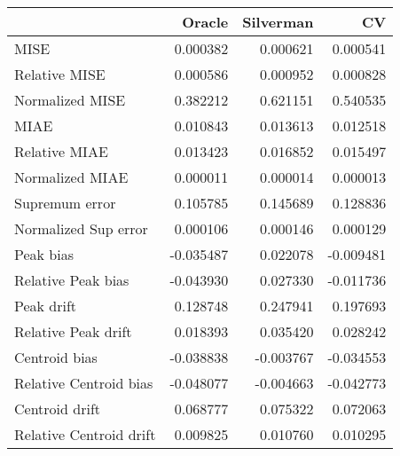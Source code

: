 \begin{tabular}{lrrr}
  \toprule
 & Oracle & Silverman & CV \\ 
  \midrule
MISE & 0.000382 & 0.000621 & 0.000541 \\ 
  Relative MISE & 0.000586 & 0.000952 & 0.000828 \\ 
  Normalized MISE & 0.382212 & 0.621151 & 0.540535 \\ 
  MIAE & 0.010843 & 0.013613 & 0.012518 \\ 
  Relative MIAE & 0.013423 & 0.016852 & 0.015497 \\ 
  Normalized MIAE & 0.000011 & 0.000014 & 0.000013 \\ 
  Supremum error & 0.105785 & 0.145689 & 0.128836 \\ 
  Normalized Sup error & 0.000106 & 0.000146 & 0.000129 \\ 
  Peak bias & -0.035487 & 0.022078 & -0.009481 \\ 
  Relative Peak bias & -0.043930 & 0.027330 & -0.011736 \\ 
  Peak drift & 0.128748 & 0.247941 & 0.197693 \\ 
  Relative Peak drift & 0.018393 & 0.035420 & 0.028242 \\ 
  Centroid bias & -0.038838 & -0.003767 & -0.034553 \\ 
  Relative Centroid bias & -0.048077 & -0.004663 & -0.042773 \\ 
  Centroid drift & 0.068777 & 0.075322 & 0.072063 \\ 
  Relative Centroid drift & 0.009825 & 0.010760 & 0.010295 \\ 
   \bottomrule
\end{tabular}
